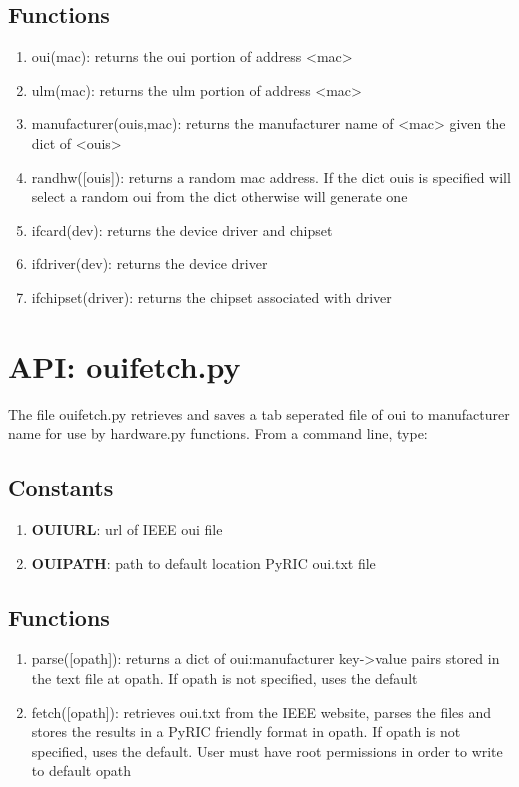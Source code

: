 \documentclass[11pt]{article}
\begin{document}
\begin{appendices}
\subsection{Functions}
\begin{enumerate}
\item oui(mac): returns the oui portion of address <mac>
\item ulm(mac): returns the ulm portion of address <mac>
\item manufacturer(ouis,mac): returns the manufacturer name of <mac> given the
dict of <ouis>
\item randhw([ouis]): returns a random mac address. If the dict ouis is specified 
will select a random oui from the dict otherwise will generate one
\item ifcard(dev): returns the device driver and chipset
\item ifdriver(dev): returns the device driver
\item ifchipset(driver): returns the chipset associated with driver
\end{enumerate}

\section{API: ouifetch.py}
The file ouifetch.py retrieves and saves a tab seperated file of oui to 
manufacturer name for use by hardware.py functions. From a command line, type: \\

\subsection{Constants}
\begin{enumerate}
\item \textbf{OUIURL}: url of IEEE oui file
\item \textbf{OUIPATH}: path to default location PyRIC oui.txt file
\end{enumerate}

\subsection{Functions}
\begin{enumerate}
\item parse([opath]): returns a dict of oui:manufacturer key->value pairs stored
in the text file at opath. If opath is not specified, uses the default
\item fetch([opath]): retrieves oui.txt from the IEEE website, parses the files
and stores the results in a PyRIC friendly format in opath. If opath is not 
specified, uses the default. User must have root permissions in order to write
to default opath 
\end{enumerate}


\end{appendices}
\end{document}
